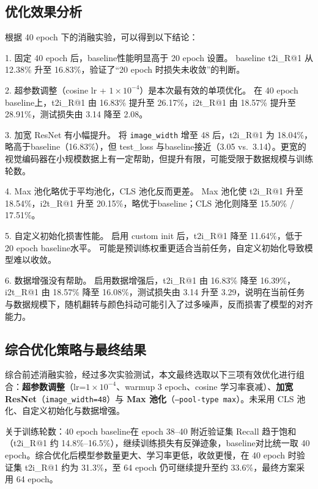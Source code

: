 \documentclass[a4paper]{article}
\begin{document}
\subsection{优化效果分析}

根据 40 epoch 下的消融实验，可以得到以下结论：

1. 固定 40 epoch 后，baseline性能明显高于 20 epoch 设置。 baseline t2i\_R@1 从 12.38\% 升至 16.83\%，验证了“20 epoch 时损失未收敛”的判断。

2. 超参数调整（cosine lr + $1\times 10^{-4}$）是本次最有效的单项优化。 在 40 epoch baseline上，t2i\_R@1 由 16.83\% 提升至 26.17\%，i2t\_R@1 由 18.57\% 提升至 28.91\%，测试损失由 3.14 降至 2.08。

3. 加宽 ResNet 有小幅提升。 将 \texttt{image\_width} 增至 48 后，t2i\_R@1 为 18.04\%，略高于baseline（16.83\%），但 test\_loss 与baseline接近（3.05 vs.\ 3.14）。更宽的视觉编码器在小规模数据上有一定帮助，但提升有限，可能受限于数据规模与训练轮数。

4. Max 池化略优于平均池化，CLS 池化反而更差。 Max 池化使 t2i\_R@1 升至 18.54\%，i2t\_R@1 升至 20.15\%，略优于baseline；CLS 池化则降至 15.50\% / 17.51\%。

5. 自定义初始化损害性能。 启用 custom init 后，t2i\_R@1 降至 11.64\%，低于 20 epoch baseline水平。 可能是预训练权重更适合当前任务，自定义初始化导致模型难以收敛。

6. 数据增强没有帮助。 启用数据增强后，t2i\_R@1 由 16.83\% 降至 16.39\%，i2t\_R@1 由 18.57\% 降至 16.08\%，测试损失由 3.14 升至 3.29，说明在当前任务与数据规模下，随机翻转与颜色抖动可能引入了过多噪声，反而损害了模型的对齐能力。


\subsection{综合优化策略与最终结果}

综合前述消融实验，经过多次实验测试，本文最终选取以下三项有效优化进行组合：\textbf{超参数调整}（lr=$1\times 10^{-4}$、warmup 3 epoch、cosine 学习率衰减）、\textbf{加宽 ResNet}（\texttt{image\_width=48}）与 \textbf{Max 池化}（\texttt{--pool-type max}）。未采用 CLS 池化、自定义初始化与数据增强。

关于训练轮数：40 epoch baseline在 epoch 38--40 附近验证集 Recall 趋于饱和（t2i\_R@1 约 14.8\%--16.5\%），继续训练损失有反弹迹象，baseline对比统一取 40 epoch。综合优化后模型参数量更大、学习率更低，收敛更慢，在 40 epoch 时验证集 t2i\_R@1 约为 31.3\%，至 64 epoch 仍可继续提升至约 33.6\%，最终方案采用 64 epoch。
\end{document}
